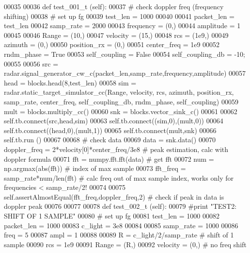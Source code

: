\begin{DoxyCode}
00035 
00036     \textcolor{keyword}{def }test_001_t (self):
00037         \textcolor{comment}{# check doppler freq (frequency shifting)}
00038         \textcolor{comment}{# set up fg}
00039         test\_len = 1000
00040         
00041         packet\_len = test\_len
00042         samp\_rate = 2000
00043         frequency = (0,)
00044         amplitude = 1
00045         
00046         Range = (10,)
00047         velocity = (15,)
00048         rcs = (1e9,)
00049         azimuth = (0,)
00050         position\_rx = (0,)
00051         center\_freq = 1e9
00052         rndm\_phase = \textcolor{keyword}{True}
00053         self\_coupling = \textcolor{keyword}{False}
00054         self\_coupling\_db = -10;
00055         
00056         src = radar.signal\_generator\_cw\_c(packet\_len,samp\_rate,frequency,amplitude)
00057         head = blocks.head(8,test\_len)
00058         sim = radar.static\_target\_simulator\_cc(Range, velocity, rcs, azimuth, position\_rx, samp\_rate, 
      center\_freq, self\_coupling\_db, rndm\_phase, self\_coupling)
00059         mult = blocks.multiply\_cc()
00060         snk = blocks.vector\_sink\_c()
00061         
00062         self.tb.connect(src,head,sim)
00063         self.tb.connect((sim,0),(mult,0))
00064         self.tb.connect((head,0),(mult,1))
00065         self.tb.connect(mult,snk)
00066         self.tb.run ()
00067         
00068         \textcolor{comment}{# check data}
00069         data = snk.data()
00070         doppler\_freq = 2*velocity[0]*center\_freq/3e8 \textcolor{comment}{# peak estimation, calc with doppler formula}
00071         fft = numpy.fft.fft(data) \textcolor{comment}{# get fft}
00072         num = np.argmax(abs(fft)) \textcolor{comment}{# index of max sample}
00073         fft\_freq = samp\_rate*num/len(fft) \textcolor{comment}{# calc freq out of max sample index, works only for frequencies <
       samp\_rate/2!}
00074         
00075         self.assertAlmostEqual(fft\_freq,doppler\_freq,2) \textcolor{comment}{# check if peak in data is doppler peak}
00076         
00077         
00078     \textcolor{keyword}{def }test_002_t (self):
00079         \textcolor{comment}{#print "TEST2: SHIFT OF 1 SAMPLE"}
00080         \textcolor{comment}{# set up fg}
00081         test\_len = 1000
00082         packet\_len = 1000
00083         c\_light = 3e8
00084         
00085         samp\_rate = 1000
00086         freq = 5
00087         ampl = 1
00088         
00089         R = c\_light/2/samp\_rate \textcolor{comment}{# shift of 1 sample}
00090         rcs = 1e9
00091         Range = (R,)
00092         velocity = (0,) \textcolor{comment}{# no freq shift}

\end{DoxyCode}
